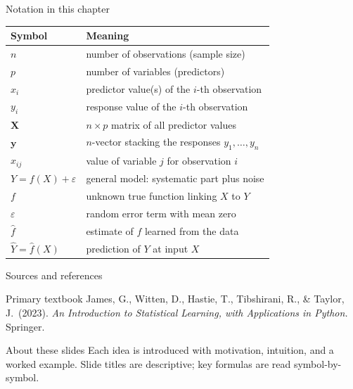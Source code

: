 \documentclass[aspectratio=169,11pt]{beamer}
\begin{document}
\begin{frame}{Notation in this chapter}
  \footnotesize
  \begin{center}
  \begin{tabular}{@{}ll@{}}
    \toprule
    \textbf{Symbol} & \textbf{Meaning} \\
    \midrule
    $n$ & number of observations (sample size) \\
    $p$ & number of variables (predictors) \\
    $x_i$ & predictor value(s) of the $i$-th observation \\
    $y_i$ & response value of the $i$-th observation \\
    $\mathbf{X}$ & $n\times p$ matrix of all predictor values \\
    $\mathbf{y}$ & $n$-vector stacking the responses $y_1,\dots,y_n$ \\
    $x_{ij}$ & value of variable $j$ for observation $i$ \\
    $Y=f(X)+\varepsilon$ & general model: systematic part plus noise \\
    $f$ & unknown true function linking $X$ to $Y$ \\
    $\varepsilon$ & random error term with mean zero \\
    $\hat f$ & estimate of $f$ learned from the data \\
    $\hat Y=\hat f(X)$ & prediction of $Y$ at input $X$ \\
    \bottomrule
  \end{tabular}
  \end{center}
\end{frame}

\begin{frame}{Sources and references}
  \begin{block}{Primary textbook}
    James, G., Witten, D., Hastie, T., Tibshirani, R., \& Taylor, J.\ (2023).
    \emph{An Introduction to Statistical Learning, with Applications in
    Python.} Springer.
  \end{block}
  \begin{block}{About these slides}
    Each idea is introduced with motivation, intuition, and a worked
    example. Slide titles are descriptive; key formulas are read
    symbol-by-symbol.
  \end{block}
\end{frame}
\end{document}
